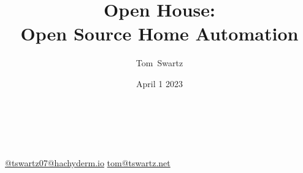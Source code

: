 \documentclass[aspectratio=169]{beamer}
\title{Open House: \\ Open Source Home Automation}
\author[Swartz]{Tom~Swartz}
\institute{Central PA Open Source Conference}
\date{April 1 2023}
\begin{document}
{
\begin{frame}[plain]
    \begin{TitleBox}
        \begin{center}
            {\color{red}\Large\inserttitle\color{black}}\\
        \end{center}
        \insertauthor{}\hfill\textbf{\insertinstitute{}}\hfill\insertdate{}\\
        {\footnotesize
        \href{https://hachyderm.io/@tswartz07}{@tswartz07@hachyderm.io}
        \hfill
        \href{mailto: tom@tswartz.net}{tom@tswartz.net}
        }
    \end{TitleBox}
    \vspace{15em}
\end{frame}}
\end{document}
